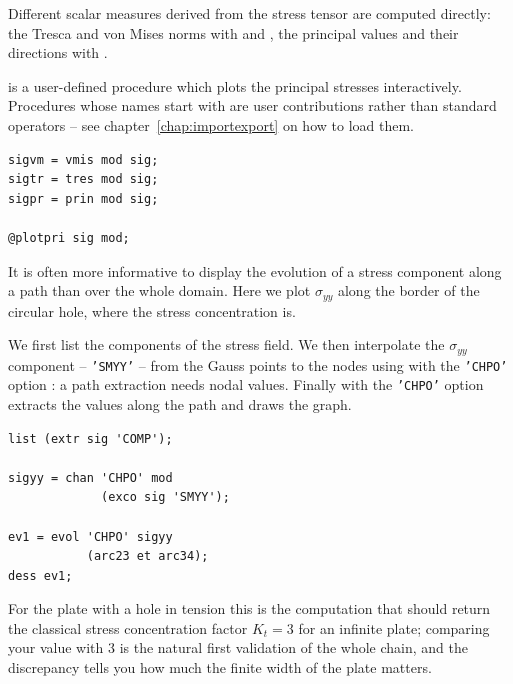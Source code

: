 \begin{castemcom}
Different scalar measures derived from the stress tensor are computed
directly: the Tresca and von Mises norms with  and
 , the principal values and
their directions with .

 is a user-defined procedure which plots the principal stresses
interactively. Procedures whose names start with  are user
contributions rather than standard operators -- see
chapter~\ref{chap:importexport} on how to load them.
\end{castemcom}
\begin{castemlines}
\begin{verbatim}
sigvm = vmis mod sig;
sigtr = tres mod sig;
sigpr = prin mod sig;

@plotpri sig mod;
\end{verbatim}
\end{castemlines}

\begin{castemcom}
It is often more informative to display the evolution of a stress component
along a path than over the whole domain. Here we plot $\sigma_{yy}$ along the
border of the circular hole, where the stress concentration is.

We first list the components of the stress field. We then interpolate the
$\sigma_{yy}$ component -- \texttt{'SMYY'} -- from the Gauss points to the
nodes using  with the \texttt{'CHPO'} option
: a path extraction
needs nodal values. Finally  with the \texttt{'CHPO'} option
extracts the values along the path  and 
draws the graph.
\end{castemcom}
\begin{castemlines}
\begin{verbatim}
list (extr sig 'COMP');

sigyy = chan 'CHPO' mod
             (exco sig 'SMYY');

ev1 = evol 'CHPO' sigyy
           (arc23 et arc34);
dess ev1;
\end{verbatim}
\end{castemlines}

\noindent For the plate with a hole in tension this is the computation that
should return the classical stress concentration factor $K_t=3$ for an
infinite plate; comparing your value with 3 is the natural first validation of
the whole chain, and the discrepancy tells you how much the finite width of
the plate matters.


